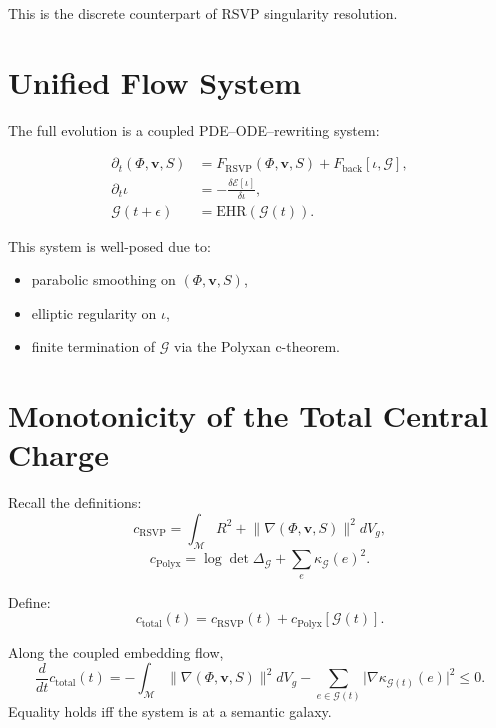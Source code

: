 This is the discrete counterpart of RSVP singularity resolution.

\section{Unified Flow System}

The full evolution is a coupled PDE–ODE–rewriting system:

\begin{align}
\partial_t(\Phi,\mathbf{v},S)
  &= F_{\mathrm{RSVP}}(\Phi,\mathbf{v},S)
   + F_{\mathrm{back}}[\iota,\mathcal{G}], \\
\partial_t\iota
  &= -\frac{\delta\mathcal{E}[\iota]}{\delta\iota}, \\
\mathcal{G}(t+\epsilon)
  &= \mathrm{EHR}(\mathcal{G}(t)).
\end{align}

This system is well-posed due to:
\begin{itemize}
\item parabolic smoothing on $(\Phi,\mathbf{v},S)$,
\item elliptic regularity on $\iota$,
\item finite termination of $\mathcal{G}$ via the Polyxan c-theorem.
\end{itemize}

\section{Monotonicity of the Total Central Charge}

Recall the definitions:
\begin{equation}
c_{\mathrm{RSVP}} = \int_{\mathcal{M}} R^2 + \lVert\nabla(\Phi,\mathbf{v},S)\rVert^2 dV_g,
\end{equation}
\begin{equation}
c_{\mathrm{Polyx}}
 = \log\det\Delta_{\mathcal{G}} + \sum_e\kappa_{\mathcal{G}}(e)^2.
\end{equation}

Define:
\begin{equation}
c_{\mathrm{total}}(t)
  = c_{\mathrm{RSVP}}(t) + c_{\mathrm{Polyx}}[\mathcal{G}(t)].
\end{equation}

\begin{theorem}
\label{thm:c-total-monotone}
Along the coupled embedding flow,
\begin{equation}
\frac{d}{dt}c_{\mathrm{total}}(t)
  = -\int_{\mathcal{M}}\lVert\nabla(\Phi,\mathbf{v},S)\rVert^2 dV_g
    - \sum_{e\in\mathcal{G}(t)}
       \bigl|\nabla\kappa_{\mathcal{G}(t)}(e)\bigr|^2
    \le 0.
\end{equation}
Equality holds iff the system is at a semantic galaxy.
\end{theorem}

